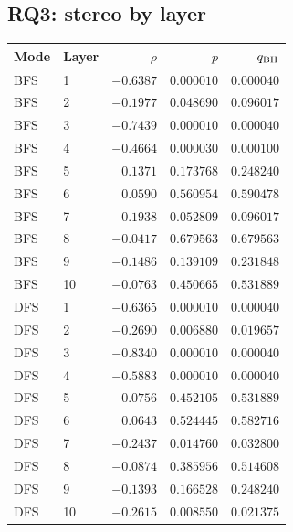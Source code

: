\documentclass[11pt,a4paper]{article}
\begin{document}
\subsection{RQ3: stereo by layer}
{\small\setlength{\tabcolsep}{5pt}
\begin{longtable}{llrrr}
\toprule
Mode & Layer & $\rho$ & $p$ & $q_{\rm BH}$ \\
\midrule\endhead
BFS & 1 & $-0.6387$ & $0.000010$ & $0.000040$ \\
BFS & 2 & $-0.1977$ & $0.048690$ & $0.096017$ \\
BFS & 3 & $-0.7439$ & $0.000010$ & $0.000040$ \\
BFS & 4 & $-0.4664$ & $0.000030$ & $0.000100$ \\
BFS & 5 & $0.1371$ & $0.173768$ & $0.248240$ \\
BFS & 6 & $0.0590$ & $0.560954$ & $0.590478$ \\
BFS & 7 & $-0.1938$ & $0.052809$ & $0.096017$ \\
BFS & 8 & $-0.0417$ & $0.679563$ & $0.679563$ \\
BFS & 9 & $-0.1486$ & $0.139109$ & $0.231848$ \\
BFS & 10 & $-0.0763$ & $0.450665$ & $0.531889$ \\
DFS & 1 & $-0.6365$ & $0.000010$ & $0.000040$ \\
DFS & 2 & $-0.2690$ & $0.006880$ & $0.019657$ \\
DFS & 3 & $-0.8340$ & $0.000010$ & $0.000040$ \\
DFS & 4 & $-0.5883$ & $0.000010$ & $0.000040$ \\
DFS & 5 & $0.0756$ & $0.452105$ & $0.531889$ \\
DFS & 6 & $0.0643$ & $0.524445$ & $0.582716$ \\
DFS & 7 & $-0.2437$ & $0.014760$ & $0.032800$ \\
DFS & 8 & $-0.0874$ & $0.385956$ & $0.514608$ \\
DFS & 9 & $-0.1393$ & $0.166528$ & $0.248240$ \\
DFS & 10 & $-0.2615$ & $0.008550$ & $0.021375$ \\
\bottomrule
\end{longtable}}
\end{document}
